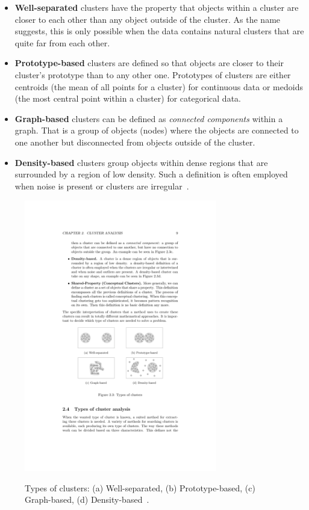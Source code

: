 \begin{itemize}

\item \textbf{Well-separated} clusters have the property that objects within a cluster are closer to each other than any object outside of the cluster. As the name suggests, this is only possible when the data contains natural clusters that are quite far from each other.

\item \textbf{Prototype-based} clusters are defined so that objects are closer to their cluster's prototype than to any other one. Prototypes of clusters are either centroids (the mean of all points for a cluster) for continuous data or medoids (the most central point within a cluster) for categorical data.

\item \textbf{Graph-based} clusters can be defined as \emph{connected components} within a graph. That is a group of objects (nodes) where the objects are connected to one another but disconnected from objects outside of the cluster.

\item \textbf{Density-based} clusters group objects within dense regions that are surrounded by a region of low density. Such a definition is often employed when noise is present or clusters are irregular~\cite{Meert06clustermaps}.

\end{itemize}

\begin{figure}[h]
  \begin{center}
    \includegraphics[width=0.75\textwidth]{figures/cluster_types.pdf}
    \label{fig:clusters}
    \caption{Types of clusters: (a) Well-separated, (b) Prototype-based, (c) Graph-based, (d) Density-based~\cite[p 9]{Meert06clustermaps}.}
  \end{center}
\end{figure}



